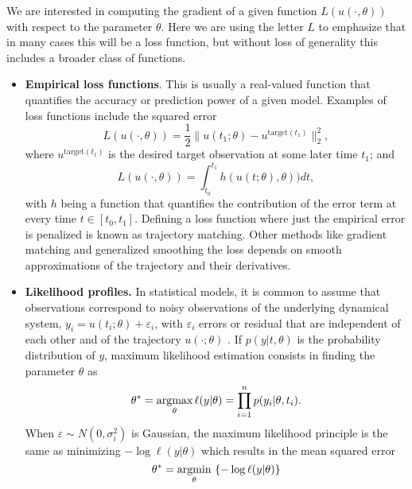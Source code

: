 We are interested in computing the gradient of a given function $L(u(\cdot, \theta))$ with respect to the parameter $\theta$.
Here we are using the letter $L$ to emphasize that in many cases this will be a loss function, but without loss of generality this includes a broader class of functions. 
\begin{itemize}
    \item \textbf{Empirical loss functions}. This is usually a real-valued function that quantifies the accuracy or prediction power of a given model. Examples of loss functions include the squared error
    \begin{equation}
     L(u(\cdot, \theta)) = \frac{1}{2} \| u(t_1; \theta) - u^{\text{target}(t_1)} \|_2^2,
     \label{eq:quadratic-loss-function}
    \end{equation}
    where $u^{\text{target}(t_1)}$ is the desired target observation at some later time $t_1$; and
    \begin{equation}
     L(u(\cdot, \theta)) = \int_{t_0}^{t_1} h( u(t;\theta), \theta) ) dt, 
    \end{equation}
    with $h$ being a function that quantifies the contribution of the error term at every time $t \in [t_0, t_1]$. 
    Defining a loss function where just the empirical error is penalized is known as trajectory matching. 
    Other methods like gradient matching and generalized smoothing the loss depends on smooth approximations of the trajectory and their derivatives. 
    \item \textbf{Likelihood profiles.} In statistical models, it is common to assume that observations correspond to noisy observations of the underlying dynamical system, $y_i = u(t_i; \theta) + \varepsilon_i$, with $\varepsilon_i$ errors or residual that are independent of each other and of the trajectory $u(\cdot ; \theta)$ \cite{ramsay2017dynamic}.
    If $p(y | t , \theta)$ is the probability distribution of $y$, maximum likelihood estimation consists in finding the parameter $\theta$ as
    \begin{equation}
        \theta^* 
        = 
        \underset{\theta}{\text{argmax}} \, \ell (y | \theta) 
        = 
        \prod_{i=1}^n p(y_i | \theta, t_i) .
    \end{equation}
    When $\varepsilon \sim N(0, \sigma_i^2)$ is Gaussian, the maximum likelihood principle is the same as minimizing $- \log \ell(y | \theta)$ which results in the mean squared error
    \begin{equation}
        \theta^* 
        = 
        \argmin{\theta} \, \left \{ - \log \ell (y | \theta) \right \}

\end{equation}
\end{itemize}
